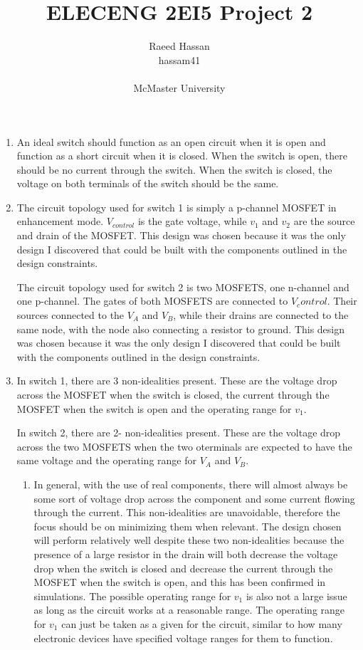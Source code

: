\documentclass[12pt]{article}
\title{ELECENG 2EI5 Project 2}
\author{Raeed Hassan \\ hassam41 \\  \\ McMaster University}
\begin{document}
\maketitle
\pagebreak

\begin{enumerate}
    \item An ideal switch should function as an open circuit when it is open and function as a short circuit when it is closed. When the switch is open, there should be no current through the switch. When the switch is closed, the voltage on both terminals of the switch should be the same.
    \item %
    The circuit topology used for switch 1 is simply a p-channel MOSFET in enhancement mode. $V_{control}$ is the gate voltage, while $v_1$ and $v_2$ are the source and drain of the MOSFET. This design was chosen because it was the only design I discovered that could be built with the components outlined in the design constraints.

    The circuit topology used for switch 2 is two MOSFETS, one n-channel and one p-channel. The gates of both MOSFETS are connected to $V_control$. Their sources connected to the $V_A$ and $V_B$, while their drains are connected to the same node, with the node also connecting a resistor to ground. This design was chosen because it was the only design I discovered that could be built with the components outlined in the design constraints.
    \item %
    In switch 1, there are 3 non-idealities present. These are the voltage drop across the MOSFET when the switch is closed, the current through the MOSFET when the switch is open and the operating range for $v_1$.

    In switch 2, there are 2- non-idealities present. These are the voltage drop across the two MOSFETS when the two oterminals are expected to have the same voltage and the operating range for $V_A$ and $V_B$.
    \begin{enumerate}
        \item %
        In general, with the use of real components, there will almost always be some sort of voltage drop across the component and some current flowing through the current. This non-idealities are unavoidable, therefore the focus should be on minimizing them when relevant. The design chosen will perform relatively well despite these two non-idealities because the presence of a large resistor in the drain will both decrease the voltage drop when the switch is closed and decrease the current through the MOSFET when the switch is open, and this has been confirmed in simulations. The possible operating range for $v_1$ is also not a large issue as long as the circuit works at a reasonable range. The operating range for $v_1$ can just be taken as a given for the circuit, similar to how many electronic devices have specified voltage ranges for them to function.


\end{enumerate}
\end{enumerate}
\end{document}
